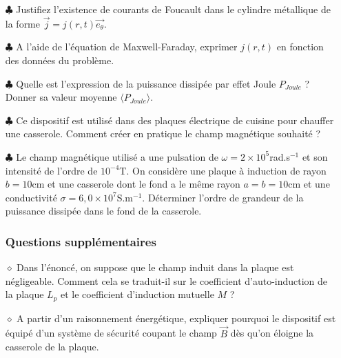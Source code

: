 \documentclass{report}
\begin{document}
\begin{itemize}

	\item[$\clubsuit$] Justifiez l'existence de courants de Foucault dans le cylindre métallique de la forme $\vec{j}=j(r,t)\vec{e_\theta}$.
	
	\item[$\clubsuit$] A l'aide de l'équation de Maxwell-Faraday, exprimer $j(r,t)$ en fonction des données du problème.
	
	\item[$\clubsuit$] Quelle est l'expression de la puissance dissipée par effet Joule $P_{Joule}$ ? Donner sa valeur moyenne $\langle P_{Joule}\rangle$.
	
	\item[$\clubsuit$] Ce dispositif est utilisé dans des plaques électrique de cuisine pour chauffer une casserole. Comment créer en pratique le champ magnétique souhaité ?
	
	\item[$\clubsuit$] Le champ magnétique utilisé a une pulsation de $\omega=2\times10^{5}$rad.s$^{-1}$ et son intensité de l'ordre de $10^{-4}$T. On considère une plaque à induction de rayon $b=10$cm et une casserole dont le fond a le même rayon $a=b=10$cm et une conductivité $\sigma=6,0\times10^{7}$S.m$^{-1}$. Déterminer l'ordre de grandeur de la puissance dissipée dans le fond de la casserole. 

\subsubsection*{Questions supplémentaires}

	\item[$\diamond$] Dans l'énoncé, on suppose que le champ induit dans la plaque est négligeable. Comment cela se traduit-il sur le coefficient d'auto-induction de la plaque $L_p$ et le coefficient d'induction mutuelle $M$ ?
	
	\item[$\diamond$] A partir d'un raisonnement énergétique, expliquer pourquoi le dispositif est équipé d'un système de sécurité coupant le champ $\vec{B}$ dès qu'on éloigne la casserole de la plaque.

\end{itemize}
\end{document}
